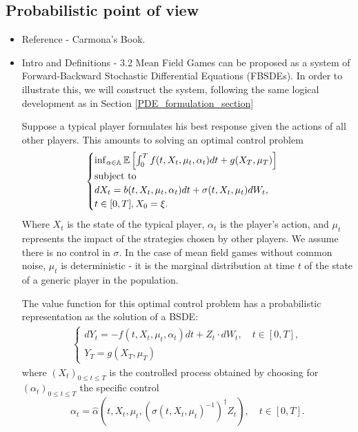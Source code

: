\documentclass{article}
\begin{document}
\subsection{Probabilistic point of view}

\begin{itemize}
    \item Reference - Carmona's Book.
    \item Intro and Definitions - 3.2
Mean Field Games can be proposed as a system of Forward-Backward Stochastic Differential Equations (FBSDEs). In order to illustrate this, we will construct the system, following the same logical development as in Section \ref{PDE_formulation_section}

Suppose a typical player formulates his best response given the actions of all other players. This amounts to solving an optimal control problem
\begin{equation}
\begin{split}
\begin{cases}
   \inf_{\alpha \in \mathbb{A}} \mathbb{E} \left[ \int_0^T f(t,X_t, \mu_t, \alpha_t) dt + g(X_T, \mu_T)\right]  \\
    \text{subject to}\\
     dX_t = b(t,X_t, \mu_t, \alpha_t) dt + \sigma(t, X_t, \mu_t) dW_t, \\ 
     t \in [0,T], X_0 = \xi.
\end{cases}
\end{split}
\end{equation}
    Where $X_t$ is the state of the typical player, $\alpha_t$ is the player's action, and $\mu_t$ represents the impact of the strategies chosen by other players. We assume there is no control in $\sigma$. In the case of mean field games without common noise, $\mu_t$ is deterministic - it is the marginal distribution at time $t$ of the state of a generic player in the population.

    The value function for this optimal control problem has a probabilistic representation as the solution of a BSDE:
\begin{equation}
    \begin{split}
    \begin{cases}
        dY_t = - f(t,X_t, \mu_t, \alpha_t) dt + Z_t \cdot dW_t, \quad t \in [0,T],\\
        Y_T = g(X_T, \mu_T)
    \end{cases}
    \end{split}
\end{equation}
    where $(X_t)_{0 \leq t \leq T}$ is the controlled process obtained by choosing for $(\alpha_t)_{0\leq t \leq T}$ the specific control 
    $$
    \alpha_t = {\hat \alpha} \left( t, X_t, \mu_t, \left(\sigma(t,X_t,\mu_t)^{-1}\right)^{\dagger} Z_t \right), \quad t \in [0,T].
    $$
    

\end{itemize}
\end{document}
